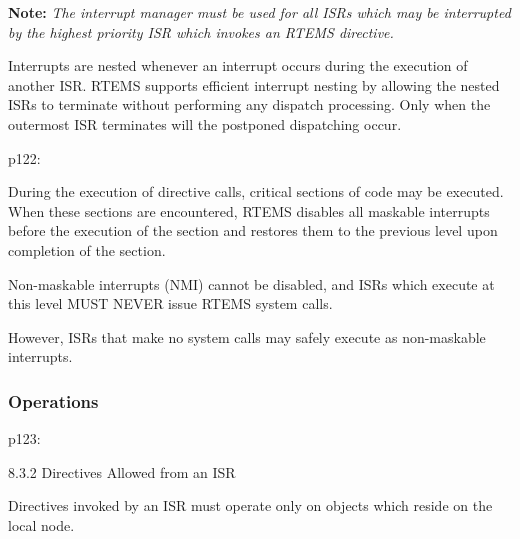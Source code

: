 \textbf{Note:} \textit{The interrupt manager must be used for all ISRs which may be interrupted by the highest
priority ISR which invokes an RTEMS directive.}

Interrupts are nested whenever an interrupt occurs during the execution of another ISR. RTEMS
supports efficient interrupt nesting by allowing the nested ISRs to terminate without performing
any dispatch processing. Only when the outermost ISR terminates will the postponed dispatching
occur.

p122:

During the execution of directive calls,
critical sections of code may be executed.
When these sections are encountered,
RTEMS disables all maskable interrupts
before the execution of the section
and restores them to the previous level upon completion of the section.

Non-maskable interrupts (NMI) cannot be disabled,
and ISRs which execute at this level MUST NEVER issue RTEMS system calls.

However,
ISRs that make no system calls may safely execute as non-maskable interrupts.

\subsubsection{Operations}

p123:

8.3.2 Directives Allowed from an ISR

Directives invoked by an ISR must operate only on objects
which reside on the local node.
